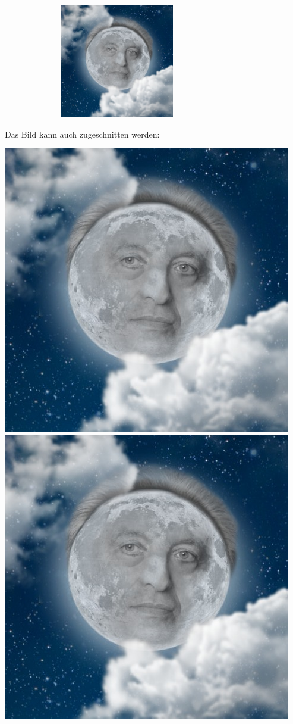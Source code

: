 \documentclass[a4paper, 10pt,onecolumn]{scrartcl}
\begin{document}
\begin{center}
	\includegraphics[width=10cm, height= 5cm]{lotze.jpg}
\end{center}

Das Bild kann auch zugeschnitten werden:

\begin{center}
	\includegraphics[clip, trim=7cm 7cm 5cm 6cm]{lotze.jpg}
	\includegraphics[clip, trim=7cm 7.5cm 6cm 7.5cm]{lotze.jpg}
\end{center}
\newpage
\end{document}
